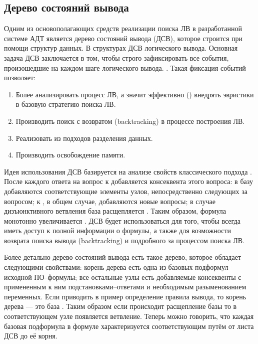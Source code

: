 \subsection{Дерево состояний вывода}
Одним из основополагающих средств реализации поиска ЛВ в разработанной системе АДТ является дерево состояний вывода (ДСВ), которое строится при помощи  структур данных. В структурах ДСВ  логического вывода. Основная задача ДСВ заключается в том, чтобы строго зафиксировать все события, произошедшие на каждом шаге логического вывода. . Такая фиксация событий позволяет:
\begin{enumerate}
 \item Более  анализировать процесс ЛВ, а значит эффективно () внедрять эвристики в базовую стратегию поиска ЛВ.
 \item Производить поиск с возвратом (backtracking) в процессе построения ЛВ.
 \item Реализовать  из подходов разделения данных.
 \item Производить  освобождение памяти.
\end{enumerate}

Идея использования ДСВ базируется на анализе свойств классического подхода . После каждого ответа на вопрос к  добавляется  консеквента этого вопроса: в базу добавляются соответствующие элементы узлов, непосредственно следующих за вопросом; к , в общем случае, добавляются новые вопросы; в случае дизъюнктивного ветвления  база расщепляется .
Таким образом, формула монотонно увеличивается . ДСВ будет использоваться для того, чтобы всегда иметь доступ к полной информации о  формулы, а также для возможности возврата поиска вывода (backtracking) и подробного  за процессом поиска ЛВ.

Более детально дерево состояний вывода есть такое дерево, которое обладает следующими свойствами: корень дерева есть одна из базовых подформул исходной ПО--формулы; все остальные узлы есть добавляемые консеквенты с примененным к ним подстановками--ответами и необходимым разыменованием переменных. Если приводить в пример определение правила вывода, то корень дерева --- это база . Таким образом если происходит расщепление базы то в соответствующем узле появляется ветвление. Теперь можно говорить, что каждая базовая подформула в формуле характеризуется соответствующим путём от листа ДСВ до её корня.

